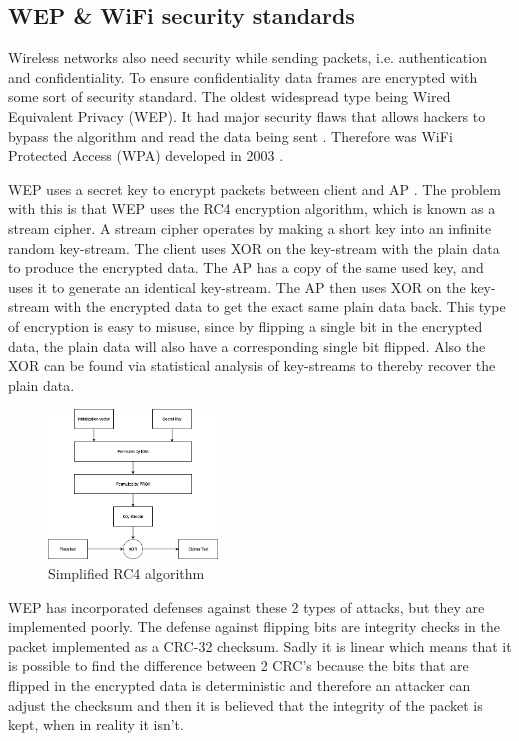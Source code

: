 \subsection{WEP & WiFi security standards}
Wireless networks also need security while sending packets, i.e. authentication and confidentiality. To ensure confidentiality data frames are encrypted with some sort of security standard. The oldest widespread type being Wired Equivalent Privacy (WEP). It had major security flaws that allows hackers to bypass the algorithm and read the data being sent \cite{WEP1}. Therefore was WiFi Protected Access (WPA) developed in 2003 \cite{WEP3}. 

WEP uses a secret key to encrypt packets between client and AP \cite{WEP2}. The problem with this is that WEP uses the RC4 encryption algorithm, which is known as a stream cipher. A stream cipher operates by making a short key into an infinite random key-stream. The client uses XOR on the key-stream with the plain data to produce the encrypted data. The AP has a copy of the same used key, and uses it to generate an identical key-stream. The AP then uses XOR on the key-stream with the encrypted data to get the exact same plain data back. This type of encryption is easy to misuse, since by flipping a single bit in the encrypted data, the plain data will also have a corresponding single bit flipped. Also the XOR can be found via statistical analysis of key-streams to thereby recover the plain data.

\begin{figure}[!htbp]
    \centering
    \includegraphics[width=0.4\textwidth]{Latex-Files/Billeder/RC4.png}
    \caption{Simplified RC4 algorithm \cite{geeks}}
    \label{RC4}
\end{figure}


WEP has incorporated defenses against these 2 types of attacks, but they are implemented poorly. The defense against flipping bits are integrity checks in the packet implemented as a CRC-32 checksum. Sadly it is linear which means that it is possible to find the difference between 2 CRC's because the bits that are flipped in the encrypted data is deterministic and therefore an attacker can adjust the checksum and then it is believed that the integrity of the packet is kept, when in reality it isn't.

